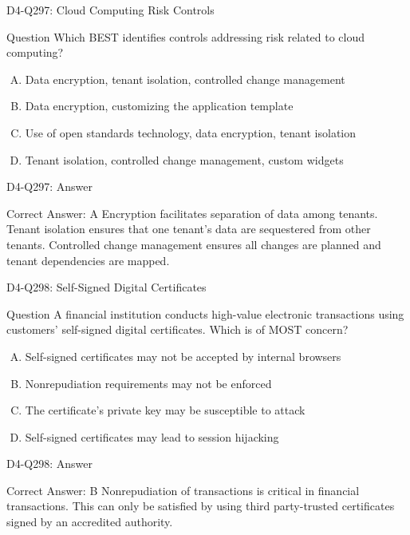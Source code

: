 \documentclass{beamer}
\begin{document}
	\begin{frame}{D4-Q297: Cloud Computing Risk Controls}
		\begin{block}{Question}
			Which BEST identifies controls addressing risk related to cloud computing?
		\end{block}
		\begin{enumerate}[(A)]
			\item Data encryption, tenant isolation, controlled change management
			\item Data encryption, customizing the application template
			\item Use of open standards technology, data encryption, tenant isolation
			\item Tenant isolation, controlled change management, custom widgets
		\end{enumerate}
	\end{frame}
	\begin{frame}{D4-Q297: Answer}
		\begin{block}{Correct Answer: A}
			Encryption facilitates separation of data among tenants. Tenant isolation ensures that one tenant's data are sequestered from other tenants. Controlled change management ensures all changes are planned and tenant dependencies are mapped.
		\end{block}
	\end{frame}
	
	\begin{frame}{D4-Q298: Self-Signed Digital Certificates}
		\begin{block}{Question}
			A financial institution conducts high-value electronic transactions using customers' self-signed digital certificates. Which is of MOST concern?
		\end{block}
		\begin{enumerate}[(A)]
			\item Self-signed certificates may not be accepted by internal browsers
			\item Nonrepudiation requirements may not be enforced
			\item The certificate's private key may be susceptible to attack
			\item Self-signed certificates may lead to session hijacking
		\end{enumerate}
	\end{frame}
	\begin{frame}{D4-Q298: Answer}
		\begin{block}{Correct Answer: B}
			Nonrepudiation of transactions is critical in financial transactions. This can only be satisfied by using third party-trusted certificates signed by an accredited authority.
		\end{block}
	\end{frame}
	
\end{document}
